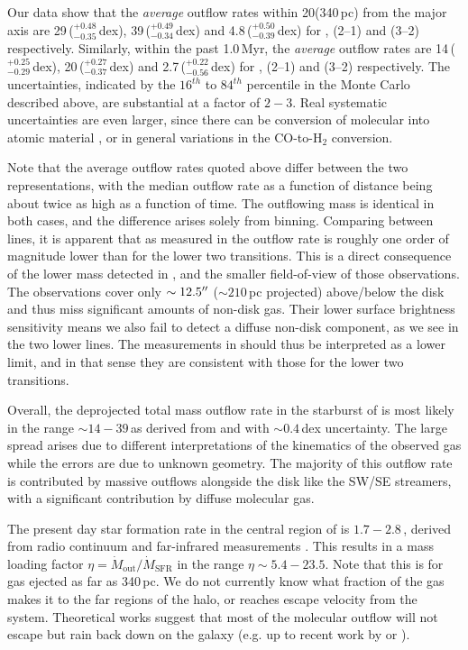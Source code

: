 Our data show that the \emph{average} outflow rates within 20\arcsec (340\,pc) from the major axis are 29\,\Msunyr ($^{+0.48}_{-0.35}$\,dex), 39\,\Msunyr ($^{+0.49}_{-0.34}$\,dex) and 4.8\,\Msunyr ($^{+0.50}_{-0.39}$\,dex) for , (2--1) and (3--2) respectively. Similarly, within the past 1.0\,Myr, the \emph{average} outflow rates are 14\,\Msunyr ($^{+0.25}_{-0.29}$\,dex), 20\,\Msunyr ($^{+0.27}_{-0.37}$\,dex) and 2.7\,\Msunyr ($^{+0.22}_{-0.56}$\,dex) for , (2--1) and (3--2) respectively. The uncertainties, indicated by the $16^{th}$ to $84^{th}$ percentile in the Monte Carlo described above, are substantial at a factor of $2-3$. Real systematic uncertainties are even larger, since there can be conversion of molecular into atomic material \citep[c.f. ][]{2015ApJ...814...83L}, or in general variations in the CO-to-H$_2$ conversion.

Note that the average outflow rates quoted above differ between the two representations, with the median outflow rate as a function of distance being about twice as high as a function of time. The outflowing mass is identical in both cases, and the difference arises solely from binning. Comparing between lines, it is apparent that as measured in  the outflow rate is roughly one order of magnitude lower than for the lower two transitions. This is a direct consequence of the lower mass detected in , and the smaller field-of-view of those observations. The  observations cover only $\sim 12.5^{\prime\prime}$ ($\sim 210$\,pc projected) above/below the disk and thus miss significant amounts of non-disk gas. Their lower surface brightness sensitivity means we also fail to detect a diffuse non-disk component, as we see in the two lower lines. The measurements in  should thus be interpreted as a lower limit, and in that sense they are consistent with those for the lower two transitions.

Overall, the deprojected total mass outflow rate in the starburst of  is most likely in the range $\sim 14-39$\,\Msunyr as derived from  and  with $\sim 0.4$\,dex uncertainty. The large spread arises due to different interpretations of the kinematics of the observed gas while the errors are due to unknown geometry.
The majority of this outflow rate is contributed by massive outflows alongside the disk like the SW/SE streamers, with a significant contribution by diffuse molecular gas.

The present day star formation rate in the central region of  is  $1.7-2.8$\,\Msunyr, derived from radio continuum and far-infrared measurements \citep{Ott:2005il,Leroy:2015ds,2015MNRAS.450L..80B}. This results in a mass loading factor $\eta = \dot{M}_\mathrm{out} / \dot{M}_\mathrm{SFR}$ in the range $\eta \sim 5.4-23.5$. Note that this is for gas ejected as far as 340\,pc. We do not currently know what fraction of the gas makes it to the far regions of the halo, or reaches escape velocity from the system. Theoretical works suggest that most of the molecular outflow will not escape but rain back down on the galaxy (e.g. \citealt{Shapiro:1976ha} up to recent work by \citealt{2018ApJ...853..173K} or \citealt{2019MNRAS.tmp..540T}).

